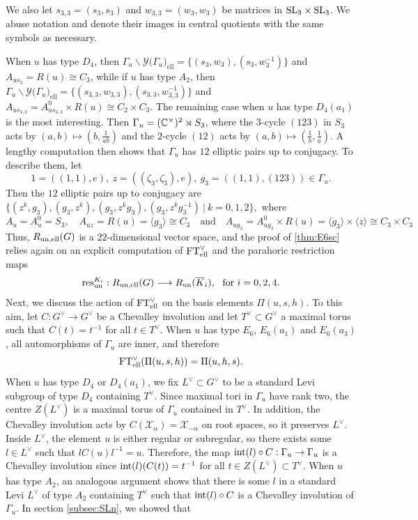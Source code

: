 We also let $s_{3,3}=(s_3,s_3)$ and $w_{3,3}=(w_3,w_3)$ be matrices in $\mathrm{SL}_3\times\mathrm{SL}_3$. We abuse notation and denote their images in central quotients with the same symbols as necessary.

When $u$ has type $D_4$, then $\Gamma_u\backslash\mathcal{Y}\mathcal(\Gamma_u)_{\text{ell}}=\{(s_3,w_3),(s_3,w_3^{-1})\}$ and $A_{us_3}=R(u)\cong C_3$, while if $u$ has type $A_2$, then $\Gamma_u\backslash\mathcal{Y}\mathcal(\Gamma_u)_{\text{ell}}=\{(s_{3,3},w_{3,3}),(s_{3,3},w_{3,3}^{-1})\}$ and $A_{us_{3,3}}=A_{us_{3,3}}^0\times R(u)\cong C_2\times C_3$. The remaining case when $u$ has type $D_4(a_1)$ is the most interesting. Then $\Gamma_u=(\mathbb{C}^\times)^2\rtimes S_3$, where the $3$-cycle $(123)$ in $S_3$ acts by $(a,b)\mapsto(b,\frac{1}{ab})$ and the $2$-cycle $(12)$ acts by $(a,b)\mapsto(\frac{1}{b},\frac{1}{a})$. A lengthy computation then shows that $\Gamma_u$ has $12$ elliptic pairs up to conjugacy. To describe them, let 
$$1=((1,1),e),\ z=((\zeta_3,\zeta_3),e),\ g_3=((1,1),(123))\in\Gamma_u.$$
Then the $12$ elliptic pairs up to conjugacy are
$\{(z^k,g_3),(g_3,z^k),(g_3,z^kg_3),(g_3,z^kg_3^{-1})\ |\ k=0,1,2\},$
where
$$A_u=A_u^0=S_3,\quad A_{uz}=R(u)=\langle g_3\rangle\cong C_3\quad\text{and}\quad A_{ug_3}=A_{ug_3}^0\times R(u)=\langle g_3\rangle\times\langle z\rangle\cong C_3\times C_3$$
Thus, $R_{\mathrm{un},\text{ell}}(G)$ is a $22$-dimensional vector space, and the proof of 
\ref{thm:E6sc} relies again on an explicit computation of $\mathrm{FT}^\vee_{\mathrm{ell}}$ and the parahoric restriction maps
$$\mathrm{res}_{\mathrm{un}}^{K_i}:R_{\mathrm{un},\text{ell}}(G)\longrightarrow R_{\mathrm{un}}(\overline{K}_i),\ \text{ for } i=0,2,4.$$
Next, we discuss the action of $\mathrm{FT}^\vee_{\mathrm{ell}}$ on the basis elements $\Pi(u,s,h)$. To this aim, let $C:G^\vee\to G^\vee$ be a Chevalley involution and let $T^\vee\subset G^\vee$ a maximal torus such that $C(t)=t^{-1}$ for all $t\in T^\vee$. When $u$ has type $E_6$, $E_6(a_1)$ and $E_6(a_3)$, all automorphisms of $\Gamma_u$ are inner, and therefore 
$$\mathrm{FT}^\vee_{\mathrm{ell}}(\Pi(u,s,h))=\Pi(u,h,s).$$ 
When $u$ has type $D_4$ or $D_4(a_1)$, we fix $L^\vee\subset G^\vee$ to be a standard Levi subgroup of type $D_4$ containing $T^\vee$. Since maximal tori in $\Gamma_u$ have rank two, the centre $Z(L^\vee)$ is a maximal torus of $\Gamma_u$ contained in $T^\vee$. In addition, the Chevalley involution acts by $C(\mathcal{X}_\alpha)=\mathcal{X}_{-\alpha}$ on root spaces, so it preserves $L^\vee$. Inside $L^\vee$, the element $u$ is either regular or subregular, so there exists some $l\in L^\vee$ such that $lC(u)l^{-1}=u$. Therefore, the map $\mathrm{int}(l)\circ C:\Gamma_u\to\Gamma_u$ is a Chevalley involution since $\mathrm{int}(l)(C(t))=t^{-1}$ for all $t\in Z(L^\vee)\subset T^\vee$. When $u$ has type $A_2$, an analogous argument shows that there is some $l$ in a standard Levi $L^\vee$ of type $A_2$ containing $T^\vee$ such that $\mathrm{int}(l)\circ C$ is a Chevalley involution of $\Gamma_u$. In section \ref{subsec:SLn}, we showed that 

